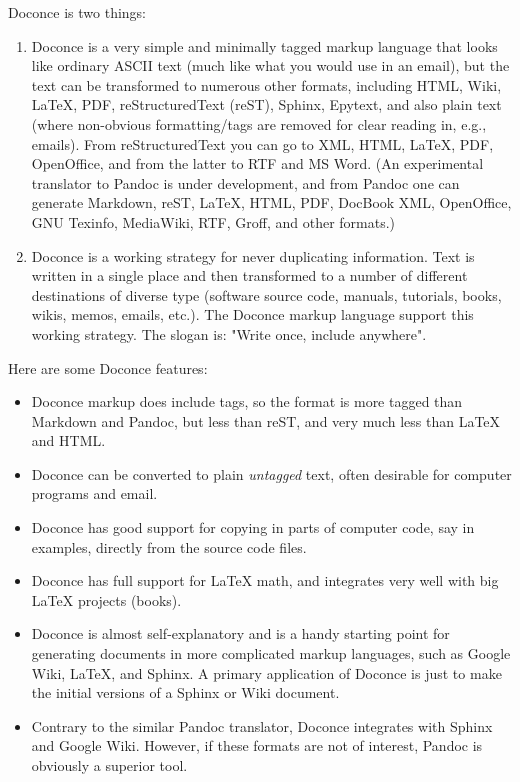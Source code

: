 \documentclass{article}
\begin{document}
Doconce is two things:

\begin{enumerate}
 \item Doconce is a very simple and minimally tagged markup language that
    looks like ordinary ASCII text (much like what you would use in an
    email), but the text can be transformed to numerous other formats,
    including HTML, Wiki, {\LaTeX}, PDF, reStructuredText (reST), Sphinx,
    Epytext, and also plain text (where non-obvious formatting/tags are
    removed for clear reading in, e.g., emails). From reStructuredText
    you can go to XML, HTML, {\LaTeX}, PDF, OpenOffice, and from the
    latter to RTF and MS Word.
    (An experimental translator to Pandoc is under development, and from
    Pandoc one can generate Markdown, reST, {\LaTeX}, HTML, PDF, DocBook XML,
    OpenOffice, GNU Texinfo, MediaWiki, RTF, Groff, and other formats.)

 \item Doconce is a working strategy for never duplicating information.
    Text is written in a single place and then transformed to
    a number of different destinations of diverse type (software
    source code, manuals, tutorials, books, wikis, memos, emails, etc.).
    The Doconce markup language support this working strategy.
    The slogan is: "Write once, include anywhere".
\end{enumerate}

\noindent
Here are some Doconce features:

\begin{itemize}
  \item Doconce markup does include tags, so the format is more tagged than 
    Markdown and Pandoc, but less than reST, and very much less than 
    {\LaTeX} and HTML. 

  \item Doconce can be converted to plain \emph{untagged} text, 
    often desirable for computer programs and email.

  \item Doconce has good support for copying in parts of computer code,
    say in examples, directly from the source code files.

  \item Doconce has full support for {\LaTeX} math, and integrates very well
    with big {\LaTeX} projects (books).

  \item Doconce is almost self-explanatory and is a handy starting point
    for generating documents in more complicated markup languages, such
    as Google Wiki, {\LaTeX}, and Sphinx. A primary application of Doconce
    is just to make the initial versions of a Sphinx or Wiki document.

  \item Contrary to the similar Pandoc translator, Doconce integrates with
    Sphinx and Google Wiki. However, if these formats are not of interest,
    Pandoc is obviously a superior tool.
\end{itemize}
\end{document}
